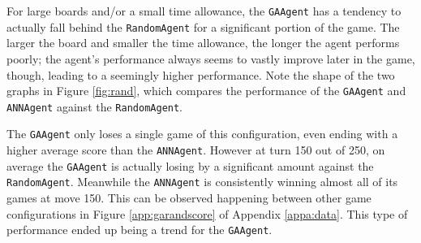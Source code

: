 For large boards and/or a small time allowance, the \texttt{GAAgent} has a tendency to actually fall behind the \texttt{RandomAgent} for a significant portion of the game.  The larger the board and smaller the time allowance, the longer the agent performs poorly; the agent's performance always seems to vastly improve later in the game, though, leading to a seemingly higher performance.  Note the shape of the two graphs in Figure \ref{fig:rand}, which compares the performance of the \texttt{GAAgent} and \texttt{ANNAgent} against the \texttt{RandomAgent}.

The \texttt{GAAgent} only loses a single game of this configuration, even ending with a higher average score than the \texttt{ANNAgent}.  However at turn 150 out of 250, on average the \texttt{GAAgent} is actually losing by a significant amount against the \texttt{RandomAgent}.  Meanwhile the \texttt{ANNAgent} is consistently winning almost all of its games at move 150.  This can be observed happening between other game configurations in Figure \ref{app:garandscore} of Appendix \ref{appa:data}.  This type of performance ended up being a trend for the \texttt{GAAgent}.

